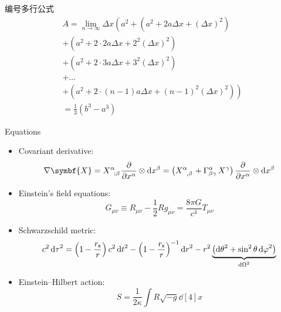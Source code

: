 \documentclass[no-math]{ctexbeamer}
\begin{document}
\begin{frame}
    \begin{exampleblock}{编号多行公式}
        \begin{multline}
            A=\lim_{n\rightarrow\infty}\Delta x\left(a^{2}+\left(a^{2}+2a\Delta x+\left(\Delta x\right)^{2}\right)\right.\label{eq:reset}\\
            +\left(a^{2}+2\cdot2a\Delta x+2^{2}\left(\Delta x\right)^{2}\right)\\
            +\left(a^{2}+2\cdot3a\Delta x+3^{2}\left(\Delta x\right)^{2}\right)\\
            +\ldots\\
            \left.+\left(a^{2}+2\cdot(n-1)a\Delta x+(n-1)^{2}\left(\Delta x\right)^{2}\right)\right)\\
            =\frac{1}{3}\left(b^{3}-a^{3}\right)
        \end{multline}
    \end{exampleblock}
\end{frame}

\begin{frame}{Equations}
    \begin{itemize}
        \item Covariant derivative:
        \[
        \nabla \symbf{X} = \tensor{X}{^\alpha_{;\beta}} \pdv{x^\alpha} \otimes \dd{x^\beta}
                        = \qty(\tensor{X}{^\alpha_{,\beta}} + \Gamma^{\alpha}_{\beta\gamma} \, X^\gamma) \,
                            \pdv{x^\alpha} \otimes \dd{x^\beta}
        \]
        \item Einstein's field equations:
        \[ G_{\mu\nu} \equiv R_{\mu\nu} - \frac{1}{2} R g_{\mu\nu} = \frac{8\pi G}{c^4} T_{\mu\nu} \]
        \item Schwarzschild metric:
        \[
        c^2 \dd{\tau}^2 = \qty(1-\frac{r_{\mathrm{s}}}{r}) \, c^2 \dd{t}^2
                        - \qty(1-\frac{r_{\mathrm{s}}}{r})^{-1} \dd{r}^2
                        - r^2 \underbrace{\qty(\dd{\theta}^2 + \sin^2 \theta \dd{\varphi}^2)}_{\dd{\Omega}^2}
        \]
        \item Einstein--Hilbert action:
        \[ S = \frac{1}{2\kappa} \int R \sqrt{-g} \dd[4]{x} \]
    \end{itemize}
\end{frame}
\end{document}
